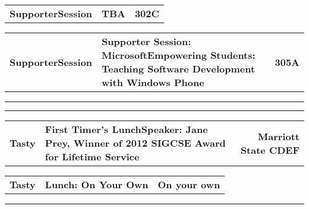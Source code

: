 \begin{longtable}[l]{@{}p{1in}@{}p{3in}@{}r}
    {\sffamily\large\textbf{SupporterSession}} & 
    {\sffamily\large\textbf{TBA}} & 
    {\sffamily\large\textbf{302C}} \\
\end{longtable}    
\begin{longtable}[l]{@{}p{1in}@{}p{3in}@{}r}
    {\sffamily\large\textbf{SupporterSession}} & 
    {\sffamily\large\textbf{Supporter Session: MicrosoftEmpowering Students: Teaching Software Development with Windows Phone}} & 
    {\sffamily\large\textbf{305A}} \\
\end{longtable}    
\vspace{0.5em}
\noindent\rule{5in}{0.02cm}
\vspace{0.5em}
\noindent
{}
\vspace{0.5em}
\noindent\rule{5in}{0.02cm}
\vspace{0.5em}
\noindent
{}
\begin{longtable}[l]{@{}p{1in}@{}p{3in}@{}r}
    {\sffamily\large\textbf{Tasty}} & 
    {\sffamily\large\textbf{First Timer's LunchSpeaker: Jane Prey, Winner of 2012 SIGCSE Award for Lifetime Service}} & 
    {\sffamily\large\textbf{Marriott State CDEF}} \\
\end{longtable}    
\begin{longtable}[l]{@{}p{1in}@{}p{3in}@{}r}
    {\sffamily\large\textbf{Tasty}} & 
    {\sffamily\large\textbf{Lunch: On Your Own}} & 
    {\sffamily\large\textbf{On your own}} \\
\end{longtable}    
\vspace{0.5em}
\noindent\rule{5in}{0.02cm}
\vspace{0.5em}
\noindent
{}
